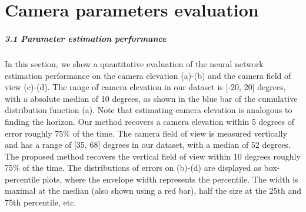 \protect\hypertarget{camparameval}{}{}

\hypertarget{camera-parameters-evaluation}{%
\section{Camera parameters
evaluation}\label{camera-parameters-evaluation}}

\protect\hypertarget{camparamestimperf}{}{}

\hypertarget{parameter-estimation-performance}{%
\subparagraph{3.1 Parameter estimation
performance}\label{parameter-estimation-performance}}

In this section, we show a quantitative evaluation of the neural network
estimation performance on the camera elevation (a)-(b) and the camera
field of view (c)-(d). The range of camera elevation in our dataset is
{[}-20, 20{]} degrees, with a absolute median of 10 degrees, as shown in
the blue bar of the cumulative distribution function (a). Note that
estimating camera elevation is analogous to finding the horizon. Our
method recovers a camera elevation within 5 degrees of error roughly
75\% of the time. The camera field of view is measured vertically and
has a range of {[}35, 68{]} degrees in our dataset, with a median of 52
degrees. The proposed method recovers the vertical field of view within
10 degrees roughly 75\% of the time. The distributions of errors on
(b)-(d) are displayed as box-percentile plots, where the envelope width
represents the percentile. The width is maximal at the median (also
shown using a red bar), half the size at the 25th and 75th percentile,
etc.


